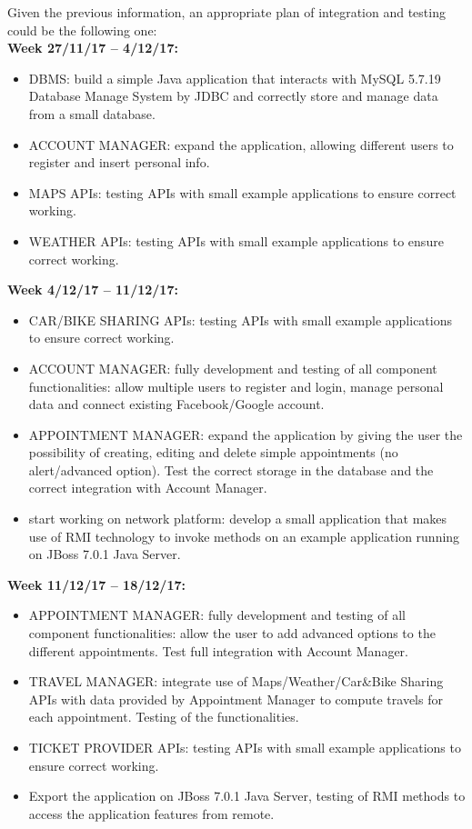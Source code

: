 Given the previous information, an appropriate plan of integration and testing could be the following one:\\
\textbf{Week 27/11/17 – 4/12/17:}
\begin{itemize}
	\item DBMS: build a simple Java application that interacts with MySQL 5.7.19 Database Manage System by JDBC and correctly store and manage data from a small database.
	\item ACCOUNT MANAGER: expand the application, allowing different users to register and insert personal info. 
	\item MAPS APIs: testing APIs with small example applications to ensure correct working.
	\item WEATHER APIs: testing APIs with small example applications to ensure correct working.
\end{itemize}
\textbf{Week 4/12/17 – 11/12/17:}
\begin{itemize}
	\item CAR/BIKE SHARING APIs: testing APIs with small example applications to ensure correct working.
	\item ACCOUNT MANAGER: fully development and testing of all component functionalities: allow multiple users to register and login, manage personal data and connect existing Facebook/Google account.
	\item APPOINTMENT MANAGER: expand the application by giving the user the possibility of creating, editing and delete simple appointments (no alert/advanced option). Test the correct storage in the database and the correct integration with Account Manager.
	\item start working on network platform: develop a small application that makes use of RMI technology to invoke methods on an example application running on JBoss 7.0.1 Java Server.
\end{itemize}
\textbf{Week 11/12/17 – 18/12/17:}
\begin{itemize}
	\item APPOINTMENT MANAGER: fully development and testing of all component functionalities: allow the user to add advanced options to the different appointments. Test full integration with Account Manager.
	\item TRAVEL MANAGER: integrate use of Maps/Weather/Car\&Bike Sharing APIs with data provided by Appointment Manager to compute travels for each appointment. Testing of the functionalities.
	\item TICKET PROVIDER APIs: testing APIs with small example applications to ensure correct working.
	\item Export the application on JBoss 7.0.1 Java Server, testing of RMI methods to access the application features from remote.
\end{itemize}
